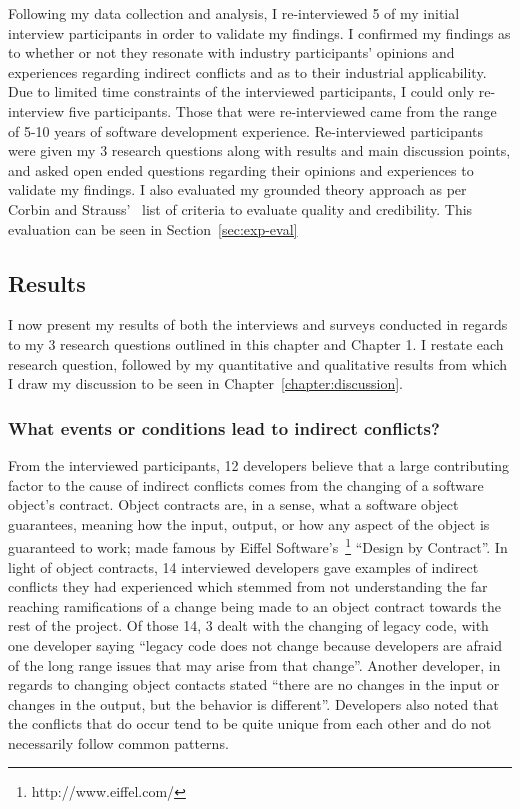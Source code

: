 Following my data collection and analysis, I re-interviewed 5 of my initial interview participants
in order to validate my findings. I confirmed my findings as to whether or not they resonate with 
industry participants' opinions and experiences regarding indirect conflicts and as to their industrial 
applicability. Due to limited time constraints of the interviewed participants, I could only re-interview
five participants. Those that were re-interviewed came from the range of 5-10 years of software development
experience. Re-interviewed participants were given my 3 research questions along with results and main
discussion points, and asked open ended questions regarding their opinions and experiences to validate my 
findings. I also evaluated my grounded theory approach as per Corbin and Strauss'~\cite{Corbin:1998:SP}
list of criteria to evaluate quality and credibility. This evaluation can be seen in Section~\ref{sec:exp-eval}

\subsection{Results}
\label{sec:exp-results}

I now present my results of both the interviews and surveys conducted in regards to my 3 research questions
outlined in this chapter and Chapter 1. I restate each research question, followed by my quantitative and qualitative
results from which I draw my discussion to be seen in Chapter~\ref{chapter:discussion}.

\subsubsection{What events or conditions lead to indirect conflicts?}

From the interviewed participants, 12 developers believe that a large contributing factor to the cause
of indirect conflicts comes from the changing of a software object's contract. Object contracts are, in a sense,
what a software object guarantees, meaning how the input, output, or how any aspect of the object is guaranteed
to work; made famous by Eiffel Software's~\footnote{http://www.eiffel.com/} ``Design by Contract''\texttrademark. 
In light of object contracts, 14 interviewed developers gave examples of indirect conflicts they had experienced
which stemmed from not understanding the far reaching ramifications of a change being made to an object contract
towards the rest of the project. Of those 14, 3 dealt
with the changing of legacy code, with one developer saying ``legacy code does not change because developers 
are afraid of the long range issues that may arise from that change''. Another developer, in regards to changing
object contacts stated ``there are no changes in the input or changes in the output, but the behavior is different''.
Developers also noted that the conflicts that do occur tend to be quite unique from each other and do not necessarily
follow common patterns.


